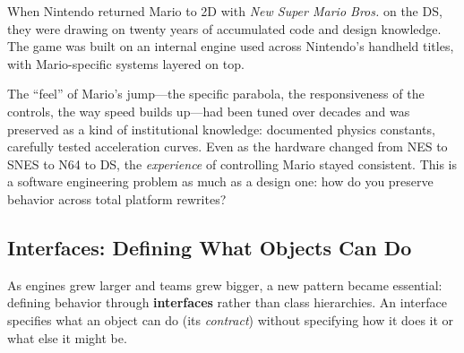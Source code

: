 \documentclass[11pt,letterpaper]{article}
\newcommand{\keyterm}[1]{\textbf{\textcolor{cssecondary}{#1}}}
\begin{document}
\begin{historybox}
When Nintendo returned Mario to 2D with \textit{New Super Mario Bros.} on the DS, they were drawing on twenty years of accumulated code and design knowledge. The game was built on an internal engine used across Nintendo's handheld titles, with Mario-specific systems layered on top.

The ``feel'' of Mario's jump---the specific parabola, the responsiveness of the controls, the way speed builds up---had been tuned over decades and was preserved as a kind of institutional knowledge: documented physics constants, carefully tested acceleration curves. Even as the hardware changed from NES to SNES to N64 to DS, the \textit{experience} of controlling Mario stayed consistent. This is a software engineering problem as much as a design one: how do you preserve behavior across total platform rewrites?
\end{historybox}

\subsection{Interfaces: Defining What Objects Can Do}

As engines grew larger and teams grew bigger, a new pattern became essential: defining behavior through \keyterm{interfaces} rather than class hierarchies. An interface specifies what an object can do (its \textit{contract}) without specifying how it does it or what else it might be.
\end{document}
